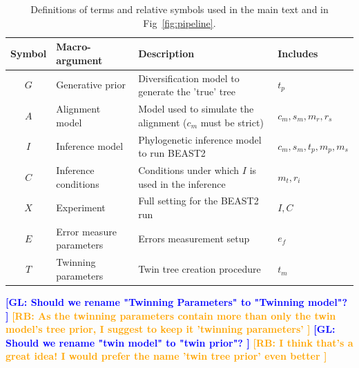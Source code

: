 \documentclass{article}
\newcommand{\giovanni}[1]{\textcolor{blue}{\textbf{[GL: #1]}}}
\newcommand{\richel}[1]{\textcolor{orange}{\textbf{[RB: #1]}}}
\begin{document}
\begin{table}
  \begin{tabular}{|@{}c|p{4cm}|p{9cm}|p{3cm}@{}|}
    \hline
    \centering
    \textbf{Symbol} & \textbf{Macro-argument} & \textbf{Description} & \textbf{Includes} \\
    \hline
    $\mathit{G}$ & Generative prior & Diversification model to generate the 'true' tree & $\mathit{t_{p}}$ \\
    $\mathit{A}$ & Alignment model & Model used to simulate the alignment ($\mathit{c_{m}}$ must be strict) & $\mathit{c_{m}}, \mathit{s_{m}}, \mathit{m_{r}}, \mathit{r_{s}}$ \\
    $\mathit{I}$ & Inference model & Phylogenetic inference model to run BEAST2 & $\mathit{c_{m}},\mathit{s_{m}},\mathit{t_{p}},\mathit{m_{p}},\mathit{m_{s}}$ \\
    $\mathit{C}$ & Inference conditions & Conditions under which $\mathit{I}$ is used in the inference & $\mathit{m_{t}}, \mathit{r_{i}}$\\
    $\mathit{X}$ & Experiment & Full setting for the BEAST2 run & $\mathit{I},\mathit{C}$ \\
    $\mathit{E}$ & Error measure parameters & Errors measurement setup & $\mathit{e_{f}}$\\
    $\mathit{T}$ & Twinning parameters & Twin tree creation procedure & $\mathit{t_{m}}$\\
    \hline 
  \end{tabular}
  \caption{
    Definitions of terms and relative symbols used in the main text and in Fig~\ref{fig:pipeline}.
  }
  \label{tab:definitions}
  \giovanni{
    Should we rename "Twinning Parameters" to "Twinning model"?
  }
  \richel{
    As the twinning parameters contain more than only the twin model's tree prior,
    I suggest to keep it 'twinning parameters'
  }
  \giovanni{
    Should we rename "twin model" to "twin prior"?
  }
  \richel{
    I think that's a great idea! I would prefer the name 'twin tree prior' even
    better
  }
\end{table}
\end{document}
